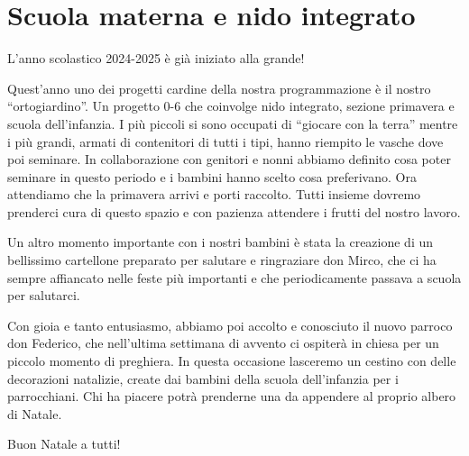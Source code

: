 \section{Scuola materna e nido integrato}

L'anno scolastico 2024-2025 è già iniziato alla grande!

Quest'anno uno dei progetti cardine della nostra programmazione è il nostro ``ortogiardino''. Un progetto 0-6 che coinvolge nido integrato, sezione primavera e scuola dell'infanzia. I più piccoli si sono occupati di ``giocare con la terra'' mentre i più grandi, armati di contenitori di tutti i tipi, hanno riempito le vasche dove poi seminare. In collaborazione con genitori e nonni abbiamo definito cosa poter seminare in questo periodo e i bambini hanno scelto cosa preferivano. Ora attendiamo che la primavera arrivi e porti raccolto. Tutti insieme dovremo prenderci cura di questo spazio e con pazienza attendere i frutti del nostro lavoro.


Un altro momento importante con i nostri bambini è stata la creazione di un bellissimo cartellone preparato per salutare e ringraziare don Mirco, che ci ha sempre affiancato nelle feste più importanti e che periodicamente passava a scuola per salutarci.

Con gioia e tanto entusiasmo, abbiamo poi accolto e conosciuto il nuovo parroco don Federico, che nell'ultima settimana di avvento ci ospiterà in chiesa per un piccolo momento di preghiera. In questa occasione lasceremo un cestino con delle decorazioni natalizie, create dai bambini della scuola dell'infanzia per i parrocchiani. Chi ha piacere potrà prenderne una da appendere al proprio albero di Natale.

Buon Natale a tutti!


